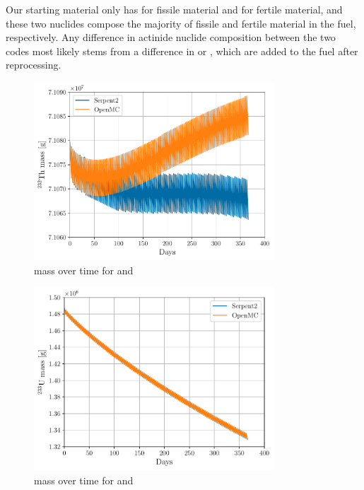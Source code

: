 Our starting material only has  for fissile material and  for fertile
material, and these two nuclides compose the majority of fissile and fertile material in the fuel,
respectively. Any difference in actinide nuclide composition between the two codes
most likely stems from a difference in  or , which are added
to the fuel after reprocessing.

\begin{figure}[htpb]
    \centering
    \includegraphics[width=0.8\textwidth]{figs/ch5/th232_mass.pdf}
    \caption{ mass over time for \OpenMC and \SerpentTWO}
    \label{fig:th232-mass}
\end{figure}

\begin{figure}[htpb]
    \centering
    \includegraphics[width=0.8\textwidth]{figs/ch5/u233_mass.pdf}
    \caption{ mass over time for \OpenMC and \SerpentTWO}
    \label{fig:u233-mass}
\end{figure}

